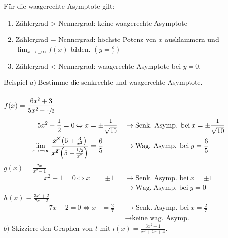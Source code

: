 \documentclass{article}
\begin{document}
Für die waagerechte Asymptote gilt:
\begin{enumerate}
    \item Zählergrad > Nennergrad: keine waagerechte Asymptote
    \item Zählergrad = Nennergrad: höchste Potenz von $x$ ausklammern und 
    $\displaystyle \lim_{x\to\pm\infty} f(x)$ bilden. $\displaystyle \left(y = \frac{a}{b}\right)$
    \item Zählergrad < Nennergrad: waagerechte Asymptote bei $y = 0$.
\end{enumerate}
\begin{boxx}[DarkBlue]{Beispiel}
    $a)$\hspace{3mm} Bestimme die senkrechte und waagerechte Asymptote.\\\\
    $\displaystyle f(x) = \frac{6x^2+3}{5x^2- \sfrac{1}{2}}$ 
    \begin{align*}
        5x^2 - \frac{1}{2} = 0 \Leftrightarrow x &= \pm\frac{1}{\sqrt{10}} & &\rightarrow \text{Senk. Asymp. bei } x = \pm\frac{1}{\sqrt{10}}\\
        \lim_{x\to\pm\infty} \frac{\cancel{x^2}\left(6 + \frac{3}{x^2}\right)}{\cancel{x^2}\left(5 - \frac{\sfrac{1}{2}}{x^2}\right)} &= \frac{6}{5}
        & &\rightarrow \text{Wag. Asymp. bei } y = \frac{6}{5}
    \end{align*}
    $\displaystyle g(x) = \frac{7x}{x^2 - 1}$
    \begin{align*}
        x^2 - 1 = 0 \Leftrightarrow x &= \pm 1 & &\rightarrow \text{Senk. Asymp. bei } x = \pm 1\\
        & & &\rightarrow \text{Wag. Asymp. bei } y = 0
    \end{align*}
    $\displaystyle h(x) = \frac{3x^2 + 2}{7x - 2}$ \\
    \begin{align*}
        7x - 2 = 0 \Leftrightarrow x &= \frac{2}{7} & &\rightarrow \text{Senk. Asymp. bei } x = \frac{2}{7} \\
        & & &\rightarrow \text{keine wag. Asymp.}
    \end{align*}
    \newpage
    $b)$\hspace{3mm} Skizziere den Graphen von $t$ mit 
    $\displaystyle t(x) = \frac{3x^2 + 1}{x^2 + 4x + 4}$.
    \begin{figure}[H]
        \centering
    \end{figure}
\end{boxx}
\end{document}

